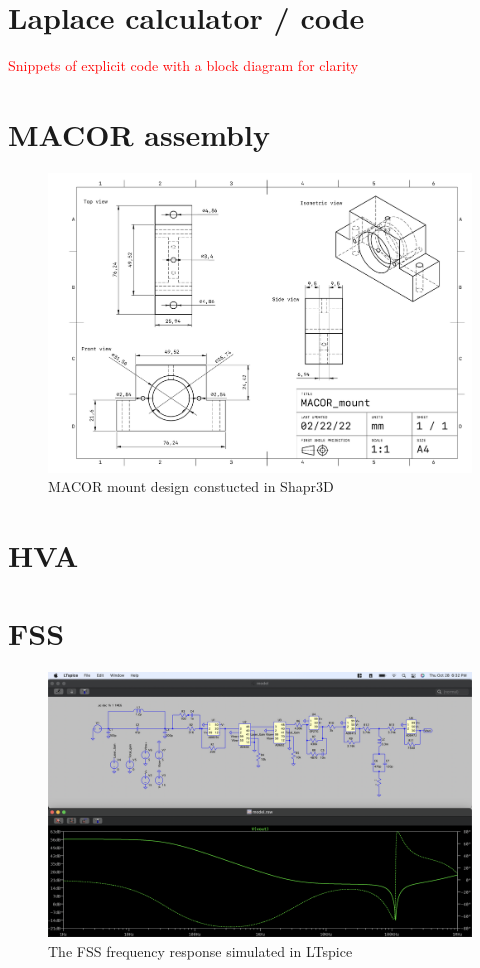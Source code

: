 \section{Laplace calculator / code}

\textcolor{red}{Snippets of explicit code with a block diagram for clarity}

\section{MACOR assembly}

\begin{figure}[H]
\includegraphics[width=\textwidth]{figs/ALGAAS/MACOR_mount.pdf}
\caption{MACOR mount design constucted in Shapr3D}
\label{fig:macor_mount_design}
\end{figure}

\section{HVA}






\section{FSS}



\begin{figure}[H]
\includegraphics[width=\textwidth]{figs/ALGAAS/tfs/spice_FSS_tf.png}
\caption{The FSS frequency response simulated in LTspice}
\label{fig:spiceFSS}
\end{figure}
